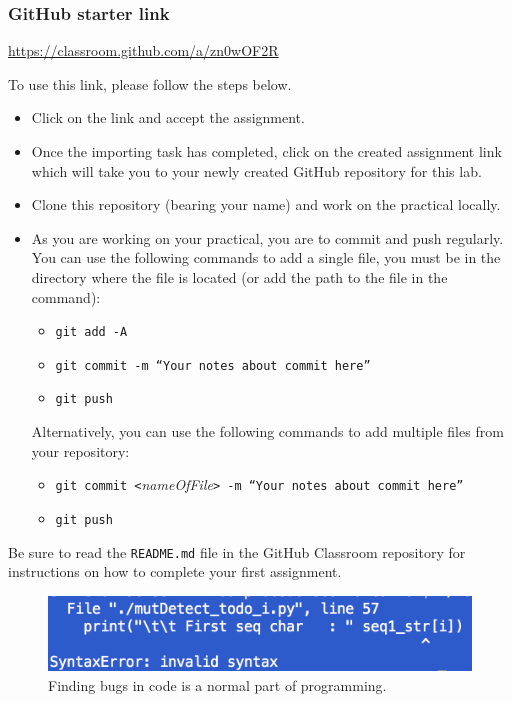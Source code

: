 \subsubsection*{GitHub starter link}
\begin{center}
\color{red} \url{https://classroom.github.com/a/zn0wOF2R} \color{black}
\end{center}



To use this link, please follow the steps below.
\begin{itemize}
	\item Click on the link and accept the assignment.
	\item Once the importing task has completed, click on the created assignment link which will take you to your newly created GitHub repository for this lab.
	\item Clone this repository (bearing your name) and work on the practical locally.
	\item As you are working on your practical, you are to commit and push regularly. You can use the following commands to add a single file, you must be in the directory where the file is located (or add the path to the file in the command):
		\begin{itemize}
		\item {\tt git add -A}
		\item {\tt git commit -m ``Your notes about commit here''}
		\item {\tt git push}
	\end{itemize}

	Alternatively, you can use the following commands to add multiple files from your repository:
	\begin{itemize}
		\item {\tt git commit <}\emph{nameOfFile}\tt{> -m ``Your notes about commit here''}
		\item {\tt git push}
	\end{itemize}
\end{itemize}

Be sure to read the {\tt README.md} file in the GitHub Classroom repository for instructions on how to complete your first assignment.


\begin{figure}[ht!]
	\begin{center}
	 \includegraphics[scale=.5]{graphics/bugs.png}
	\end{center}
	\caption{Finding bugs in code is a normal part of programming.}
	\label{fig:bugs}
\end{figure}


